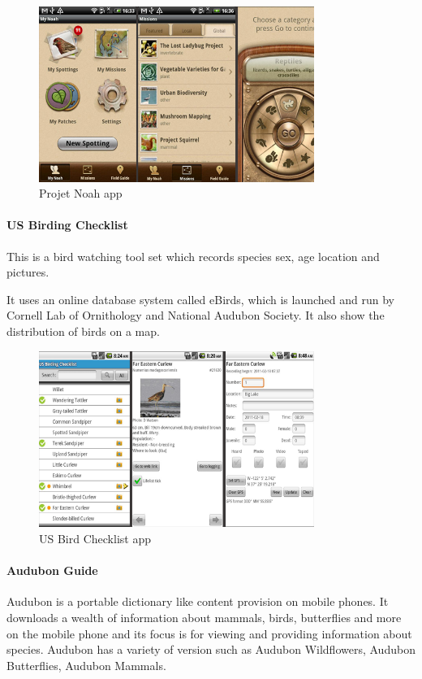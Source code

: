 \begin{figure}[htb]
    \centering
    \includegraphics[width=0.8\textwidth]{introduction/project_description/noah.png}
    \caption{Projet Noah app}
    \label{fig:Noahapp}
\end{figure}

\paragraph{US Birding Checklist}
This is a bird watching tool set which records species sex, age location and pictures\cite{similarproduct:usbird}.

It uses an online database system called eBirds\cite{similarproduct:ebird}, which is launched and run by Cornell Lab of Ornithology and National Audubon Society. It also show the distribution of birds on a map.

\begin{figure}[htb]
    \centering
    \includegraphics[width=0.8\textwidth]{introduction/project_description/usbirdingchecklist.png}
    \caption{US Bird Checklist app}
    \label{fig:usbirdapp}
\end{figure}

\paragraph{Audubon Guide}
Audubon is a portable dictionary like content provision on mobile phones. It downloads a wealth of information about mammals, birds, butterflies and more on the mobile phone and its focus is for viewing and providing information about species\cite{similarproduct:audubon}. Audubon has a variety of version such as Audubon Wildflowers, Audubon Butterflies, Audubon Mammals.

